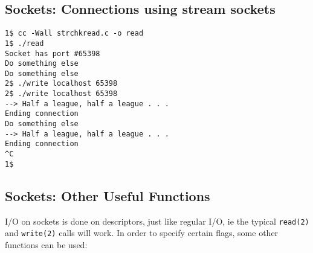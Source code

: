 \documentclass[xga]{xdvislides}
\begin{document}
\subsection{Sockets: Connections using stream sockets}
\begin{verbatim}
1$ cc -Wall strchkread.c -o read
1$ ./read
Socket has port #65398
Do something else
Do something else
2$ ./write localhost 65398
2$ ./write localhost 65398
‐-> Half a league, half a league . . .
Ending connection
Do something else
--> Half a league, half a league . . .
Ending connection
^C
1$
\end{verbatim}
\vfill


\subsection{Sockets: Other Useful Functions}

I/O on sockets is done on descriptors, just like regular I/O, ie the typical
{\tt read(2)} and {\tt write(2)} calls will work.  In order to specify certain
flags, some other functions can be used:
\end{document}
